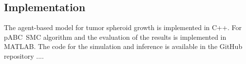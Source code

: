 \documentclass[10pt,letterpaper]{article}
\newcommand{\jh}[1]{{\color{red}#1}}
\begin{document}
\subsection*{Implementation}
The agent-based model for tumor spheroid growth is implemented in C++. For pABC~SMC algorithm and the evaluation of the results is implemented in MATLAB. The code for the simulation and inference is available in the GitHub repository \jh{...}. 

%
%
%
%
\end{document}
